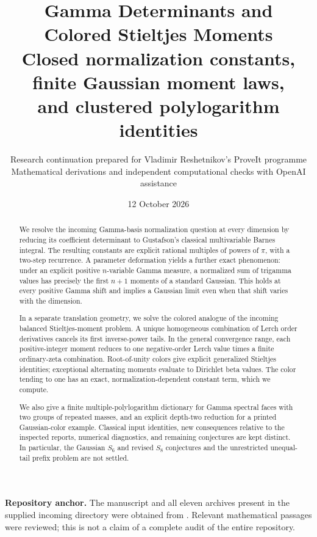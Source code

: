 \documentclass[11pt,a4paper]{article}
\title{\textbf{Gamma Determinants and\\Colored Stieltjes Moments}\\[7pt]
 \large Closed normalization constants, finite Gaussian moment laws,\\
 and clustered polylogarithm identities}
\author{Research continuation prepared for Vladimir Reshetnikov's ProveIt programme\\
 \small Mathematical derivations and independent computational checks with OpenAI assistance}
\date{12 October 2026}
\begin{document}
\maketitle
\begin{abstract}
We resolve the incoming Gamma-basis normalization question at every
dimension by reducing its coefficient determinant to Gustafson's
classical multivariable Barnes integral. The resulting constants are
explicit rational multiples of powers of $\pi$, with a two-step
recurrence. A parameter deformation yields a further exact phenomenon:
under an explicit positive $n$-variable Gamma measure, a normalized sum
of trigamma values has precisely the first $n+1$ moments of a standard
Gaussian. This holds at every positive Gamma shift and implies a
Gaussian limit even when that shift varies with the dimension.

In a separate translation geometry, we solve the colored analogue of
the incoming balanced Stieltjes-moment problem. A unique homogeneous
combination of Lerch order derivatives cancels its first inverse-power
tails. In the general convergence range, each positive-integer moment reduces to one
negative-order Lerch value times a finite ordinary-zeta combination.
Root-of-unity colors give explicit generalized Stieltjes identities;
exceptional alternating moments evaluate to Dirichlet beta values.
The color tending to one has an exact, normalization-dependent
constant term, which we compute.

We also give a finite multiple-polylogarithm dictionary for Gamma
spectral faces with two groups of repeated masses, and an explicit
depth-two reduction for a printed Gaussian-color example.
Classical input identities, new consequences relative to the inspected
reports, numerical diagnostics, and remaining conjectures are kept
distinct. In particular, the Gaussian $S_6$ and revised $S_8$ conjectures
and the unrestricted unequal-tail prefix problem are not settled.
\end{abstract}
\vfill
{\noindent\small\textbf{Repository anchor.} The manuscript and all eleven
archives present in the supplied incoming directory were obtained from
\pin. Relevant mathematical passages were reviewed; this is not a
claim of a complete audit of the entire repository.\par}
\clearpage
{\small\tableofcontents}
\clearpage








\end{document}
